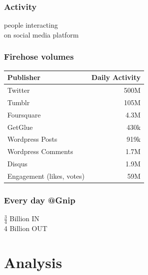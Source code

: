\documentclass{beamer}
\begin{document}

\begin{frame}\frametitle{Activity}
\begin{center}
{\Huge people interacting \\ [8pt] on social media platform}
\end{center}
\end{frame}


\begin{frame} \frametitle{Firehose volumes}
\begin{table}
\begin{tabular}{l|r}
\hline
   {Publisher}   &   {Daily Activity}   \\
\hline 
    Twitter      &      500M   \\
    Tumblr      &       105M   \\
    Foursquare &       4.3M \\
    GetGlue &         430k \\
    Wordpress Posts &     919k   \\
    Wordpress Comments & 1.7M \\
    Disqus       &       1.9M  \\
    Engagement (likes, votes) & 59M  \\
\hline
\end{tabular}
\end{table}
\end{frame}

%
\begin{frame}\frametitle{Every day @Gnip}
\begin{center}
{\Huge $\frac{3}{4}$ Billion IN \\ [18pt] 4 Billion OUT}
\end{center}
\end{frame}

\section{Analysis}
{
\begin{frame}
\textcolor{black} {
\hfill \Huge \insertsection}
\end{frame}
}
\end{document}
